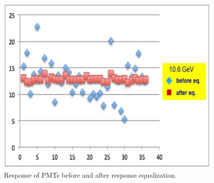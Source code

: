 \begin{figure}[ht]
\centering
\includegraphics[width=0.99\linewidth]{images/NICK_svodni.jpg}
\caption{Response of PMTs before and after response equalization.}
\label{fig:NICK_svodni}
\end{figure}

